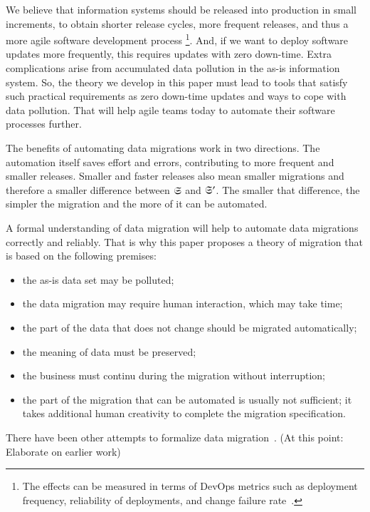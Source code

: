 \documentclass{elsarticle}
\begin{document}
   We believe that information systems should be released into production in small increments,
   to obtain shorter release cycles, more frequent releases, and thus a more agile software development process%
   \footnote{The effects can be measured in terms of DevOps metrics such as
   deployment frequency,
   reliability of deployments, and
   change failure rate~\cite{DevOps2021}.}.
   And, if we want to deploy software updates more frequently, this requires updates with zero down-time.
   Extra complications arise from accumulated data pollution in the as-is information system.
   So, the theory we develop in this paper must lead to tools that satisfy such practical requirements as
   zero down-time updates and ways to cope with data pollution.
   That will help agile teams today to automate their software processes further.

   The benefits of automating data migrations work in two directions.
   The automation itself saves effort and errors,
   contributing to more frequent and smaller releases.
   Smaller and faster releases also mean smaller migrations
   and therefore a smaller difference between $\mathfrak{S}$ and $\mathfrak{S}'$.
   The smaller that difference, the simpler the migration and the more of it can be automated.

   A formal understanding of data migration will help to automate data migrations correctly and reliably.
   That is why this paper proposes a theory of migration that is based on the
   following premises:
\begin{itemize}
   \item the as-is data set may be polluted;
   \item the data migration may require human interaction, which may take time;
   \item the part of the data that does not change should be migrated automatically;
   \item the meaning of data must be preserved;
   \item the business must continu during the migration without interruption;
   \item the part of the migration that can be automated is usually not sufficient;
         it takes additional human creativity to complete the migration specification.
\end{itemize}

   There have been other attempts to formalize data migration~\cite{Thalheim2013}.
   (At this point: Elaborate on earlier work)
\end{document}
